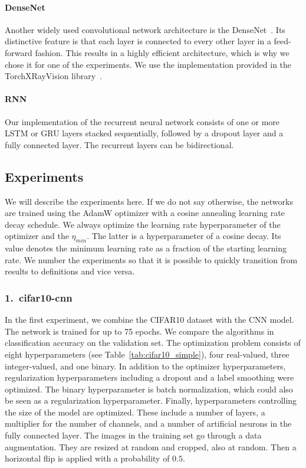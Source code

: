 \paragraph{DenseNet}
Another widely used convolutional network architecture is the DenseNet~\cite{huang2017densely}. Its distinctive feature is that each layer is connected to every other layer in a feed-forward fashion. This results in a highly efficient architecture, which is why we chose it for one of the experiments. We use the implementation provided in the TorchXRayVision library~\cite{Cohen2022xrv}.

\paragraph{RNN}
Our implementation of the recurrent neural network consists of one or more LSTM or GRU layers stacked sequentially, followed by a dropout layer and a fully connected layer. The recurrent layers can be bidirectional.


\subsection{Experiments}
We will describe the experiments here. If we do not say otherwise, the networks are trained using the AdamW optimizer with a cosine annealing learning rate decay schedule. We always optimize the learning rate hyperparameter of the optimizer and the $\eta_{min}$. The latter is a hyperparameter of a cosine decay. Its value denotes the minimum learning rate as a fraction of the starting learning rate. We number the experiments so that it is possible to quickly transition from results to definitions and vice versa.

\subsubsection{1.\ cifar10-cnn}
In the first experiment, we combine the CIFAR10 dataset with the CNN model. The network is trained for up to 75 epochs. We compare the algorithms in classification accuracy on the validation set. The optimization problem consists of eight hyperparameters (see Table~\ref{tab:cifar10_simple}), four real-valued, three integer-valued, and one binary. In addition to the optimizer hyperparameters, regularization hyperparameters including a dropout and a label smoothing were optimized. The binary hyperparameter is batch normalization, which could also be seen as a regularization hyperparameter. Finally, hyperparameters controlling the size of the model are optimized. These include a number of layers, a multiplier for the number of channels, and a number of artificial neurons in the fully connected layer. The images in the training set go through a data augmentation. They are resized at random and cropped, also at random. Then a horizontal flip is applied with a probability of $0.5$.


